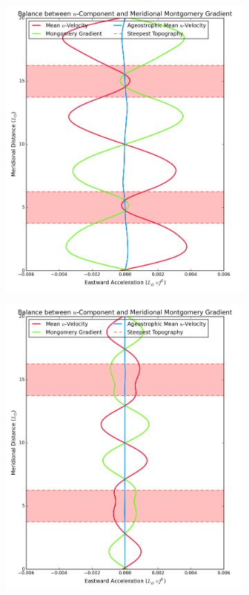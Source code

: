 \documentclass[12pt,a4paper]{report}
\begin{document}
 \begin{figure}
 	\centering
 	\begin{subfigure}{0.48\linewidth}
 		\centering
 		\caption{}
 		\includegraphics[width=\linewidth ]{vgeo_3}
 		\label{fig:vgeolayer3}
 	\end{subfigure}
 	\quad
 	\begin{subfigure}{0.48\linewidth}
 		\caption{}
 		\centering
 		\includegraphics[width=\linewidth ]{vgeo_2}

\end{subfigure}
\end{figure}
\end{document}
